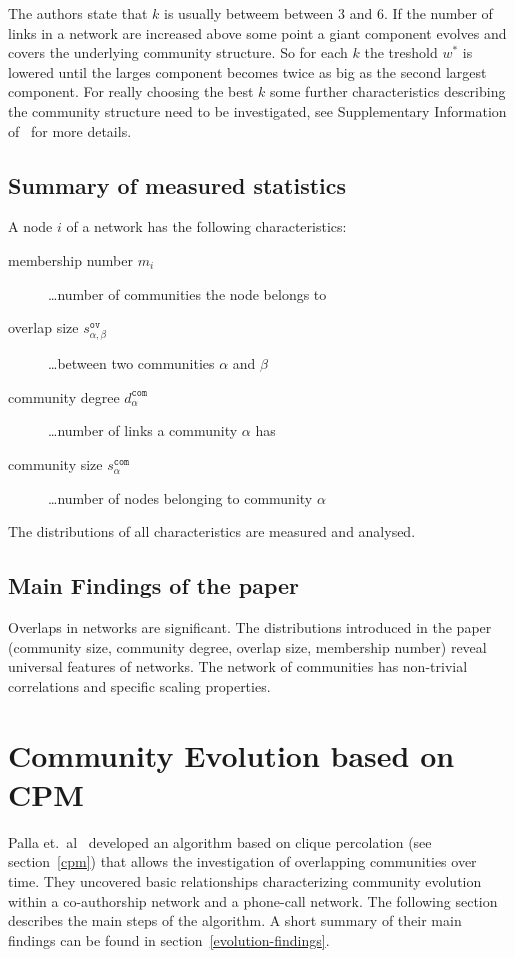 \documentclass[runningheads,a4paper]{llncs}
\begin{document}
The authors state that $k$ is usually betweem between $3$ and $6$.
If the number of links in a network are increased above some point a giant component evolves and covers the underlying community structure.
So for each $k$ the treshold $w^*$ is lowered until the larges component becomes twice as big as the second largest component. For really choosing the best $k$ some further characteristics describing the community structure need to be investigated, see Supplementary Information of~\cite{palla2005uncovering} for more details.

\subsection{Summary of measured statistics}
A node $i$ of a network has the following characteristics:

\begin{description}
	\item[membership number \textbf{$m_i$}] \dots number of communities the node belongs to
	\item[overlap size $s^\texttt{ov}_{\alpha,\beta}$] \dots between two communities $\alpha$ and $\beta$
	\item[community degree $d_{\alpha}^\texttt{com}$] \dots number of links a community $\alpha$ has
	\item[community size $s_{\alpha}^\texttt{com}$] \dots number of nodes belonging to community $\alpha$
\end{description}

The distributions of all characteristics are measured and analysed.

\subsection{Main Findings of the paper}
Overlaps in networks are significant. The distributions introduced in the paper (community size, community degree, overlap size, membership number) reveal universal features of networks. The network of communities has non-trivial correlations and specific scaling properties.~\cite{palla2005uncovering}

\section{Community Evolution based on CPM}
\label{evolution}
Palla et.~al~\cite{palla2007quantifying} developed an algorithm based on clique percolation (see section~\ref{cpm}) that allows the investigation of overlapping communities over time. They uncovered basic relationships characterizing community evolution within a co-authorship network and a phone-call network. The following section describes the main steps of the algorithm. A short summary of their main findings can be found in section~\ref{evolution-findings}.
\end{document}
